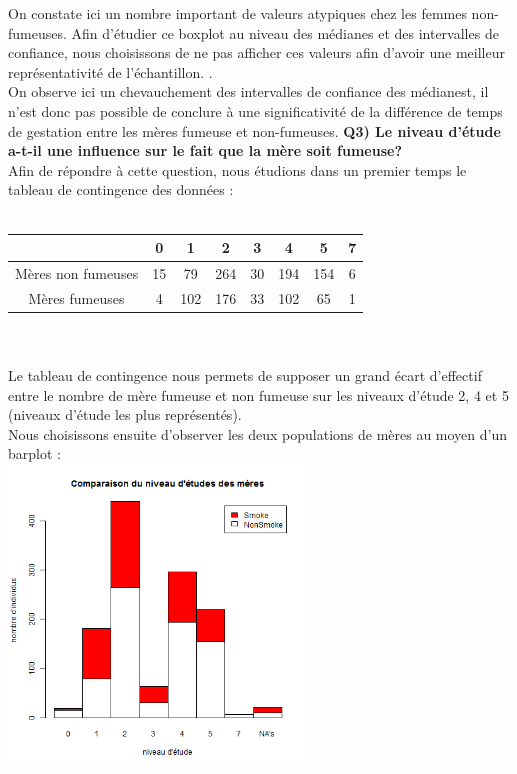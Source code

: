 \documentclass[a4paper, 8pt]{article}
\begin{document}
On constate ici un nombre important de valeurs atypiques chez les femmes non-fumeuses.
Afin d'\'etudier ce boxplot au niveau des m\'edianes et des intervalles de confiance, nous choisissons de ne pas afficher ces valeurs afin d’avoir une meilleur représentativité de l’échantillon.
.\\
On observe ici un chevauchement des intervalles de confiance des m\'edianest, il n'est donc pas possible de conclure à une significativité de la différence de temps de gestation entre les mères fumeuse et non-fumeuses.
\newpage
\textbf{Q3) Le niveau d’étude a-t-il une influence sur le fait que la mère soit fumeuse?}\\
Afin de r\'epondre \`a cette question, nous \'etudions dans un premier temps le tableau de contingence des donn\'ees :\\ \\
\begin{tabular}{|c|c|c|c|c|c|c|c|}
\hline
 & 0 & 1 & 2 & 3 & 4 & 5 & 7\\
\hline
M\`eres non fumeuses & 15 & 79 & 264 & 30 & 194 & 154 & 6 \\
\hline
M\`eres fumeuses & 4 & 102 & 176 & 33 & 102 & 65 & 1 \\
\hline
\end{tabular}\\
\\Le tableau de contingence nous permets de supposer un grand écart d’effectif entre le nombre de mère fumeuse et non fumeuse sur les niveaux d'étude 2, 4 et 5 (niveaux d’étude les plus représentés).
\\
Nous choisissons ensuite d’observer les deux populations de m\`eres au moyen d'un barplot :\\
\includegraphics[height = 8cm, width = 8cm]{plots/barplot_etude_smoke.png}\\
\end{document}
